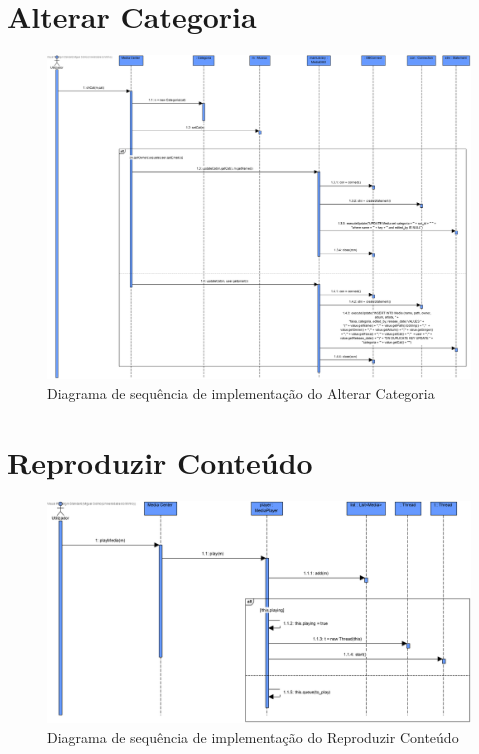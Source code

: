 \documentclass[a4paper]{report}
\begin{document}
\section{Alterar Categoria}

\begin{figure}[H]
	\centering 
    \includegraphics[width=\textwidth]{images/altcategoriaImp.png}  
    \caption{Diagrama de sequência de implementação do Alterar Categoria}
\end{figure}

\section{Reproduzir Conteúdo}

\begin{figure}[H]
	\centering 
    \includegraphics[width=\textwidth]{images/repConteudoImp.png}  
    \caption{Diagrama de sequência de implementação do Reproduzir Conteúdo}
\end{figure}
\end{document}
